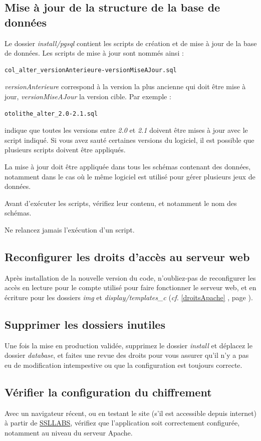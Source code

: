 \subsection{Mise à jour de la structure de la base de données}

Le dossier \textit{install/pgsql} contient les scripts de création et de mise à jour de la base de données. Les scripts de mise à jour sont nommés ainsi :
\begin{lstlisting}
col_alter_versionAnterieure-versionMiseAJour.sql
\end{lstlisting}

\textit{versionAnterieure} correspond à la version la plus ancienne qui doit être mise à jour, \textit{versionMiseAJour} la version cible. Par exemple :
\begin{lstlisting}
otolithe_alter_2.0-2.1.sql
\end{lstlisting}
indique que toutes les versions entre \textit{2.0} et \textit{2.1} doivent être mises à jour avec le script indiqué. Si vous avez \og sauté \fg{} certaines versions du logiciel, il est possible que plusieurs scripts doivent être appliqués.

La mise à jour doit être appliquée dans tous les schémas contenant des données, notamment dans le cas où le même logiciel est utilisé pour gérer plusieurs jeux de données.

Avant d'exécuter les scripts, vérifiez leur contenu, et notamment le nom des schémas.

Ne relancez jamais l'exécution d'un script.

\subsection{Reconfigurer les droits d'accès au serveur web}

Après installation de la nouvelle version du code, n'oubliez-pas de reconfigurer les accès en lecture pour le compte utilisé pour faire fonctionner le serveur web, et en écriture pour les dossiers \textit{img} et \textit{display/templates\_c} (\textit{cf.} \ref{droitsApache} \textit{}, page \pageref{droitsApache}).

\subsection{Supprimer les dossiers inutiles}
Une fois la mise en production validée, supprimez le dossier \textit{install} et déplacez le dossier \textit{database}, et faites une revue des droits pour vous assurer qu'il n'y a pas eu de modification intempestive ou que la configuration est toujours correcte.

\subsection{Vérifier la configuration du chiffrement}
Avec un navigateur récent, ou en testant le site (s'il est accessible depuis internet) à partir de \href{https://www.ssllabs.com/ssltest/}{SSLLABS}, vérifiez que l'application soit correctement configurée, notamment au niveau du serveur Apache.
